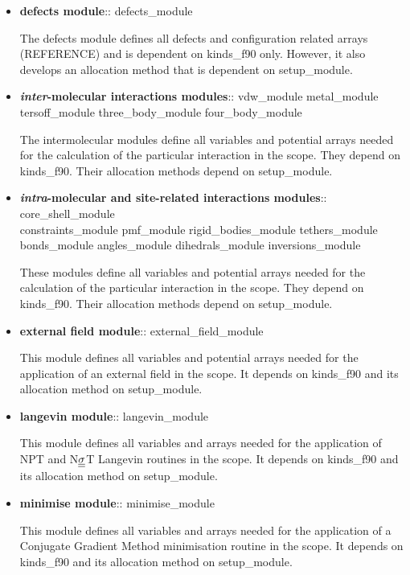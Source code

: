 \begin{itemize}
\item {\bf defects module}:: {\sc defects\_module}

The defects module defines all defects and configuration related
arrays (REFERENCE) and is dependent on {\sc kinds\_f90} only.
However, it also develops an allocation method that is dependent
on {\sc setup\_module}.

\item {\bf {\em inter}-molecular interactions modules}:: {\sc
vdw\_module metal\_module \\
tersoff\_module three\_body\_module four\_body\_module}

The intermolecular modules define all variables and potential
arrays needed for the calculation of the particular interaction in
the \D scope.  They depend on {\sc kinds\_f90}.  Their allocation
methods depend on {\sc setup\_module}.

\item {\bf {\em intra}-molecular and site-related interactions
modules}:: {\sc core\_shell\_module \\ constraints\_module pmf\_module
rigid\_bodies\_module tethers\_module \\ bonds\_module angles\_module dihedrals\_module
inversions\_module}

These modules define all variables and potential arrays needed for
the calculation of the particular interaction in the \D scope.
They depend on {\sc kinds\_f90}.  Their allocation methods depend
on {\sc setup\_module}.

\item {\bf external field module}:: {\sc external\_field\_module}

This module defines all variables and potential arrays needed for
the application of an external field in the \D scope.  It depends
on {\sc kinds\_f90} and its allocation method on {\sc setup\_module}.

\item {\bf langevin module}:: {\sc langevin\_module}

This module defines all variables and arrays needed for the
application of NPT and N$\mbox{$\underline{\underline{\bf \sigma}}$}$T Langevin routines
in the \D scope.  It depends on {\sc kinds\_f90} and its
allocation method on {\sc setup\_module}.

\item {\bf minimise module}:: {\sc minimise\_module}

This module defines all variables and arrays needed for the
application of a Conjugate Gradient Method minimisation routine
in the \D scope.  It depends on {\sc kinds\_f90} and its
allocation method on {\sc setup\_module}.


\end{itemize}
